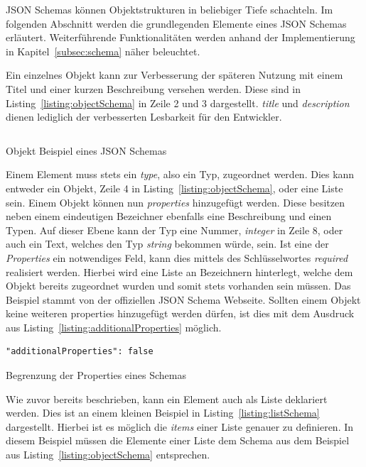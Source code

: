 JSON Schemas können Objektstrukturen in beliebiger Tiefe schachteln.
Im folgenden Abschnitt werden die grundlegenden Elemente eines JSON Schemas erläutert.
Weiterführende Funktionalitäten werden anhand der Implementierung in Kapitel~\ref{subsec:schema} näher beleuchtet.

Ein einzelnes Objekt kann zur Verbesserung der späteren Nutzung mit einem Titel und einer kurzen Beschreibung versehen werden.
Diese sind in Listing~\ref{listing:objectSchema} in Zeile 2 und 3 dargestellt.
\textit{title} und \textit{description} dienen lediglich der verbesserten Lesbarkeit für den Entwickler.

\begin{listing}[!ht]
    \inputminted{json}{listings/2.2.1/object.schema.json}
    \caption{Objekt Beispiel eines JSON Schemas}
    \label{listing:objectSchema}
\end{listing}

Einem Element muss stets ein \textit{type}, also ein Typ, zugeordnet werden.
Dies kann entweder ein Objekt, Zeile 4 in Listing~\ref{listing:objectSchema}, oder eine Liste sein.
Einem Objekt können nun \textit{properties} hinzugefügt werden.
Diese besitzen neben einem eindeutigen Bezeichner ebenfalls eine Beschreibung und einen Typen.
Auf dieser Ebene kann der Typ eine Nummer, \textit{integer} in Zeile 8, oder auch ein Text, welches den Typ \textit{string} bekommen würde, sein.
Ist eine der \textit{Properties} ein notwendiges Feld, kann dies mittels des Schlüsselwortes \textit{required} realisiert werden.
Hierbei wird eine Liste an Bezeichnern hinterlegt, welche dem Objekt bereits zugeordnet wurden und somit stets vorhanden sein müssen.
Das Beispiel stammt von der offiziellen JSON Schema Webseite.\cite*{schemaExample}
Sollten einem Objekt keine weiteren properties hinzugefügt werden dürfen, ist dies mit dem Ausdruck aus Listing~\ref{listing:additionalProperties} möglich.

\begin{listing}[!ht]
    \begin{verbatim}
"additionalProperties": false
    \end{verbatim}
    \caption{Begrenzung der Properties eines Schemas}
    \label{listing:additionalProperties}
\end{listing}

Wie zuvor bereits beschrieben, kann ein Element auch als Liste deklariert werden.
Dies ist an einem kleinen Beispiel in Listing~\ref{listing:listSchema} dargestellt.
Hierbei ist es möglich die \textit{items} einer Liste genauer zu definieren.
In diesem Beispiel müssen die Elemente einer Liste dem Schema aus dem Beispiel aus Listing~\ref{listing:objectSchema} entsprechen.

